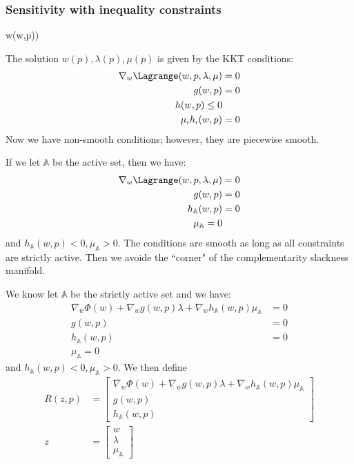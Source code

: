 \documentclass{article}
\theoremstyle{example}
\theoremstyle{definition}
\theoremstyle{assumption}
\theoremstyle{lemma}
\begin{document}
	\subsubsection{Sensitivity with inequality constraints}
		\begin{mini!}
			{w}{\Phi(w,p))}{}{}
		\end{mini!}	
	The solution $w(p),\lambda(p),\mu(p)$ is given by the KKT conditions:
	\begin{align*}
		\nabla_w\Lagrange(w,p,\lambda,\mu)&=0\\
		g(w,p)&=0\\
		h(w,p)\leq0\\
		\mu_ih_i(w,p)&=0
	\end{align*}
	Now we have non-smooth conditions; however, they are piecewise smooth.
	\par
	If we let $\mathbb{A}$ be the active set, then we have:
	\begin{align*}
		\nabla_w\Lagrange(w,p,\lambda,\mu)&=0\\
		g(w,p)&=0\\
		h_\mathbb{A}(w,p)&=0\\
		\mu_\mathbb{A}=0
	\end{align*}
	and $h_\mathbb{A}(w,p)<0,\mu_\mathbb{A}>0$. The conditions are smooth as long as all constraints are strictly active. Then we avoide the ``corner" of the complementarity slackness manifold.
	\par
	We know let $\mathbb{A}$ be the strictly active set and we have:
	\begin{align*}
		\nabla_w\Phi(w)+\nabla_wg(w,p)\lambda+\nabla_wh_\mathbb{A}(w,p)\mu_\mathbb{A}&=0\\
		g(w,p)&=0\\
		h_\mathbb{A}(w,p)&=0\\
		\mu_\mathbb{A}=0
	\end{align*}
	and $h_\mathbb{A}(w,p)<0,\mu_\mathbb{A}>0$. We then define
	\begin{align*}
		R(z,p)&=
		\begin{bmatrix}
			\nabla_w\Phi(w)+\nabla_wg(w,p)\lambda+\nabla_wh_\mathbb{A}(w,p)\mu_\mathbb{A}\\
			g(w,p)\\
			h_\mathbb{A}(w,p)
		\end{bmatrix}\\
		z&=
		\begin{bmatrix}
			w\\ \lambda \\ \mu_\mathbb{A}
		\end{bmatrix}
	\end{align*}
\end{document}
